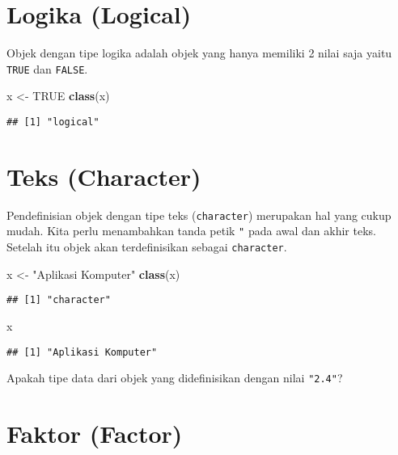 \documentclass[
]{book}
\newenvironment{Shaded}{\begin{snugshade}}{\end{snugshade}}
\newcommand{\KeywordTok}[1]{\textcolor[rgb]{0.13,0.29,0.53}{\textbf{#1}}}
\newcommand{\NormalTok}[1]{#1}
\newcommand{\OtherTok}[1]{\textcolor[rgb]{0.56,0.35,0.01}{#1}}
\newcommand{\StringTok}[1]{\textcolor[rgb]{0.31,0.60,0.02}{#1}}
\begin{document}
\hypertarget{logical}{%
\section{Logika (Logical)}\label{logical}}

Objek dengan tipe logika adalah objek yang hanya memiliki 2 nilai saja yaitu \texttt{TRUE} dan \texttt{FALSE}.

\begin{Shaded}
\begin{Highlighting}[]
\NormalTok{x <-}\StringTok{ }\OtherTok{TRUE}
\KeywordTok{class}\NormalTok{(x)}
\end{Highlighting}
\end{Shaded}

\begin{verbatim}
## [1] "logical"
\end{verbatim}

\hypertarget{character}{%
\section{Teks (Character)}\label{character}}

Pendefinisian objek dengan tipe teks (\texttt{character}) merupakan hal yang cukup mudah. Kita perlu menambahkan tanda petik \texttt{"} pada awal dan akhir teks. Setelah itu objek akan terdefinisikan sebagai \texttt{character}.

\begin{Shaded}
\begin{Highlighting}[]
\NormalTok{x <-}\StringTok{ "Aplikasi Komputer"}
\KeywordTok{class}\NormalTok{(x)}
\end{Highlighting}
\end{Shaded}

\begin{verbatim}
## [1] "character"
\end{verbatim}

\begin{Shaded}
\begin{Highlighting}[]
\NormalTok{x}
\end{Highlighting}
\end{Shaded}

\begin{verbatim}
## [1] "Aplikasi Komputer"
\end{verbatim}

Apakah tipe data dari objek yang didefinisikan dengan nilai \texttt{"2.4"}?

\hypertarget{factor}{%
\section{Faktor (Factor)}\label{factor}}
\end{document}
